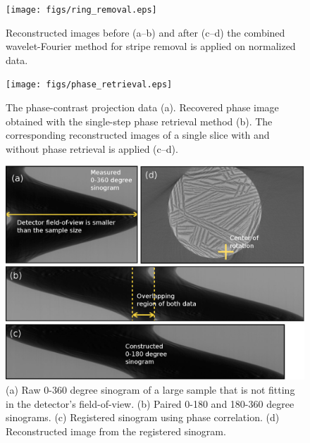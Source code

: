 \documentclass[pdf]{iucr}              %
\begin{document}
\begin{figure}
\centering
\texttt{[image: figs/ring\_removal.eps]}
\caption{Reconstructed images before (a--b) and after (c--d) the combined wavelet-Fourier method for stripe removal is applied on normalized data.}
\label{fig:ProcessRing}
\end{figure}

\begin{figure}
\centering
\texttt{[image: figs/phase\_retrieval.eps]}
\caption{The phase-contrast projection data (a). Recovered phase image obtained with the single-step phase retrieval method (b). The corresponding reconstructed images of a single slice with and without phase retrieval is applied (c--d).}
\label{fig:ProcessPhase}
\end{figure}

\begin{figure}
\centering
\includegraphics[width=\textwidth]{figs/fov_correction.eps}
\caption{(a) Raw 0-360 degree sinogram of a large sample that is not fitting in the detector's field-of-view. (b) Paired 0-180 and 180-360 degree sinograms. (c) Registered sinogram using phase correlation. (d) Reconstructed image from the registered sinogram.}
\label{fov_correction}
\end{figure}
\end{document}
